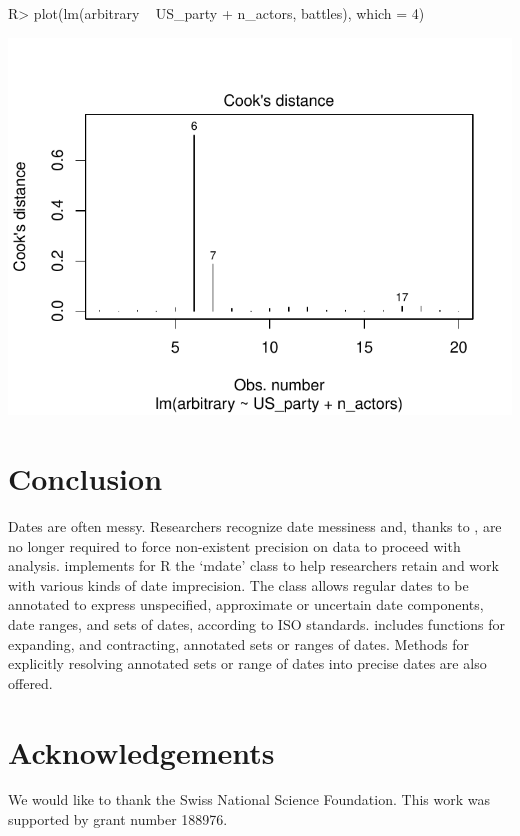 \documentclass[
]{jss}
\begin{document}
\begin{CodeChunk}
\begin{CodeInput}
R> plot(lm(arbitrary ~ US_party + n_actors, battles), which = 4)
\end{CodeInput}


\begin{center}\includegraphics{messydates_article_files/figure-latex/outliers-1} \end{center}

\end{CodeChunk}

\hypertarget{conclusion}{%
\section{Conclusion}\label{conclusion}}

Dates are often messy. Researchers recognize date messiness and, thanks
to , are no longer required to force non-existent
precision on data to proceed with analysis.  implements
for R the `mdate' class to help researchers retain and work with various
kinds of date imprecision. The class allows regular dates to be
annotated to express unspecified, approximate or uncertain date
components, date ranges, and sets of dates, according to ISO standards.
 includes functions for expanding, and contracting,
annotated sets or ranges of dates. Methods for explicitly resolving
annotated sets or range of dates into precise dates are also offered.

\hypertarget{acknowledgements}{%
\section{Acknowledgements}\label{acknowledgements}}

We would like to thank the Swiss National Science Foundation. This work
was supported by grant number 188976.

\renewcommand\refname{References}

\end{document}
